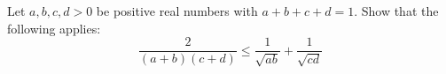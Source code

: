Let $a,b,c,d>0$ be positive real numbers with $a+b+c+d=1$.
Show that the following applies:
$$\frac{2}{(a+b)(c+d)}\leq\frac{1}{\sqrt{ab}}+\frac{1}{\sqrt{cd}}$$